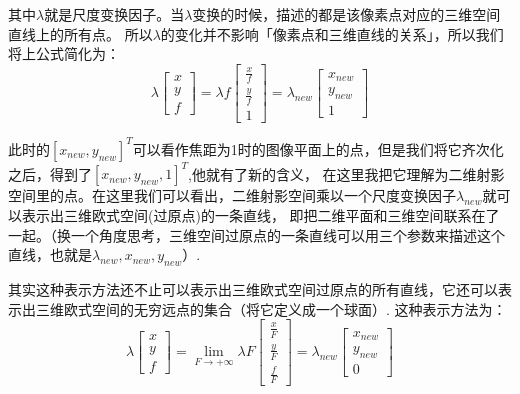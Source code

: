 \documentclass[12pt]{article}
\begin{document}
其中$\lambda$就是尺度变换因子。当$\lambda$变换的时候，描述的都是该像素点对应的三维空间直线上的所有点。
所以$\lambda$的变化并不影响「像素点和三维直线的关系」，所以我们将上公式简化为：
\begin{equation}
    \lambda\left[\begin{array}{l}
        x \\
        y \\
        f
        \end{array}\right]=\lambda f\left[\begin{array}{l}
        \frac{x}{f} \\
        \frac{y}{f} \\
        1
        \end{array}\right]=\lambda_{new}\left[\begin{array}{l}
        x_{new} \\
        y_{new} \\
        1
        \end{array}\right]
\end{equation}

此时的$[x_{new},y_{new}]^T$可以看作焦距为1时的图像平面上的点，但是我们将它齐次化之后，得到了$[x_{new},y_{new},1]^T$,他就有了新的含义，
在这里我把它理解为二维射影空间里的点。在这里我们可以看出，二维射影空间乘以一个尺度变换因子$\lambda_{new}$就可以表示出三维欧式空间(过原点)的一条直线，
即把二维平面和三维空间联系在了一起。（换一个角度思考，三维空间过原点的一条直线可以用三个参数来描述这个直线，也就是$\lambda_{new},x_{new},y_{new}$）.

其实这种表示方法还不止可以表示出三维欧式空间过原点的所有直线，它还可以表示出三维欧式空间的无穷远点的集合（将它定义成一个球面）.
这种表示方法为：
\begin{equation}
    \lambda\left[\begin{array}{l}
        x \\
        y \\
        f
        \end{array}\right]=\lim_{F \to +\infty}\lambda F\left[\begin{array}{l}
        \frac{x}{F} \\
        \frac{y}{F} \\
        \frac{f}{F}
        \end{array}\right]=\lambda_{new}\left[\begin{array}{l}
        x_{new} \\
        y_{new} \\
        0
        \end{array}\right]
\end{equation}
\end{document}

